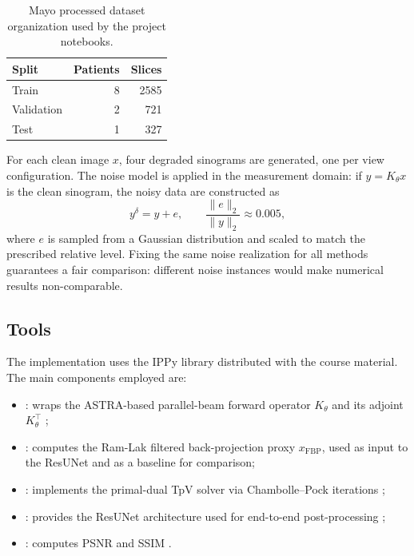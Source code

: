 \documentclass[11pt,a4paper]{article}
\begin{document}
\begin{table}[t]
  \centering
  \caption{Mayo processed dataset organization used by the project notebooks.}
  \label{tab:mayo-split}
  \begin{tabular}{lrr}
    \toprule
    Split & Patients & Slices \\
    \midrule
    Train & 8 & 2585 \\
    Validation & 2 & 721 \\
    Test & 1 & 327 \\
    \bottomrule
  \end{tabular}
\end{table}

For each clean image $x$, four degraded sinograms are generated, one per view
configuration. The noise model is applied in the measurement domain: if
$y = K_\theta x$ is the clean sinogram, the noisy data are constructed as
\begin{equation}
  y^{\delta} = y + e,
  \qquad
  \frac{\|e\|_2}{\|y\|_2} \approx 0.005,
  \label{eq:relative-noise}
\end{equation}
where $e$ is sampled from a Gaussian distribution and scaled to match the
prescribed relative level. Fixing the same noise realization for all methods
guarantees a fair comparison: different noise instances would make numerical
results non-comparable.

\subsection*{Tools}

The implementation uses the IPPy library distributed with the course material.
The main components employed are:
\begin{itemize}[leftmargin=*]
  \item {}: wraps the ASTRA-based parallel-beam
        forward operator $K_\theta$ and its adjoint $K_\theta^\top$
        \cite{astra2016};
  \item {}: computes the Ram-Lak filtered back-projection
        proxy $x_{\mathrm{FBP}}$, used as input to the ResUNet and as a
        baseline for comparison;
  \item {}: implements the
        primal-dual TpV solver via Chambolle--Pock iterations
        \cite{chambolle2011first};
  \item {}: provides the ResUNet architecture used for
        end-to-end post-processing \cite{ronneberger2015unet};
  \item {}: computes PSNR and SSIM \cite{wang2004ssim}.
\end{itemize}
\end{document}
